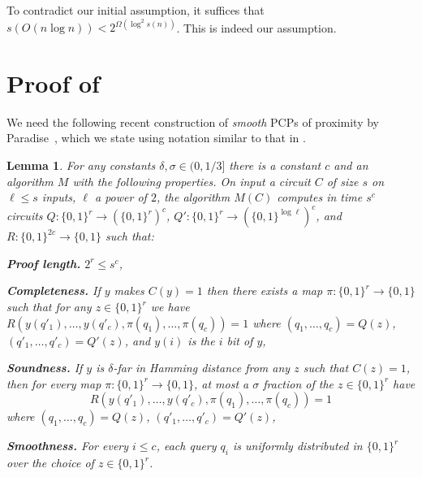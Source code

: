 \documentclass{toc}
\newtheorem{lem}[theorem]{Lemma}  %
\newcommand{\zo}{\{0, 1\}}
\begin{document}
To contradict our initial assumption, it suffices that $s(O(n\log n))<2^{\Omega(\log^{2}s(n))}$.
This is indeed our assumption.

\section{Proof of  \label{sec:Proof-of-Lemma-stronger-AC}}

We need the following recent construction of \emph{smooth} PCPs of
proximity by Paradise~\cite{DBLP:journals/eccc/Paradise19}, which
we state using notation similar to that in .
\begin{lem}
\label{lem:smooth-PCP}For any constants $\delta,\sigma\in(0,1/3]$
there is a constant $c$ and an algorithm $M$ with the following
properties. On input a circuit $C$ of size $s$ on $\ell\le s$ inputs,
$\ell$ a power of $2$, the algorithm $M(C)$ computes in time $s^{c}$
circuits $Q:\zo^{r}\to(\zo^{r})^{c}$, $Q':\zo^{r}\to(\zo^{\log\ell})^{c}$,
and $R:\zo^{2c}\to\zo$ such that:

\textbf{Proof length.} $2^{r}\le s^{c}$,

\textbf{Completeness.} If $y$ makes $C(y)=1$ then there exists a
map $\pi:\zo^{r}\to\zo$ such that for any $z\in\zo^{r}$ we have
$R(y(q'_{1}),\ldots,y(q'_{c}),\pi(q_{1}),\ldots,\pi(q_{c}))=1$ where
$(q_{1},\ldots,q_{c})=Q(z)$, $(q'_{1},\ldots,q'_{c})=Q'(z)$, and
$y(i)$ is the $i$ bit of $y$,

\textbf{Soundness.} If $y$ is $\delta$-far in Hamming distance from
any $z$ such that $C(z)=1$, then for every map $\pi:\zo^{r}\to\zo$,
at most a $\sigma$ fraction of the
$z\in\zo^{r}$ have  %
%
\[ R(y(q'_{1}),\ldots,y(q'_{c}),\pi(q_{1}),\ldots,\pi(q_{c}))=1 \]  %
where $(q_{1},\ldots,q_{c})=Q(z)$, $(q'_{1},\ldots,q'_{c})=Q'(z)$,

\textbf{Smoothness.} For every $i\le c$, each query $q_{i}$ is uniformly
distributed in $\zo^{r}$ over the choice of $z\in\zo^{r}$.
\end{lem}
\end{document}
